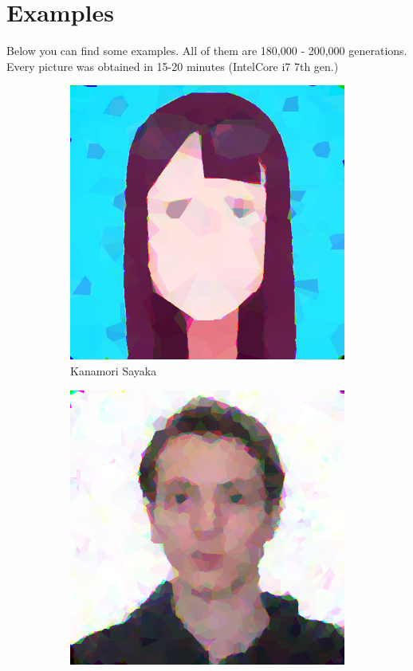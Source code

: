 \documentclass{article}
\begin{document}
\section{Examples}
Below you can find some examples. All of them are 180,000 - 200,000 generations. Every picture was obtained in 15-20 minutes (IntelCore i7 7th gen.)
\begin{figure}[ht]
   	 \centering
     \begin{subfigure}[b]{0.45\textwidth}
         \centering
         \includegraphics[width=\textwidth]{latex_src/voronoi6.png}
         \caption{Kanamori Sayaka}
     \end{subfigure}
     \hfill
     \begin{subfigure}[b]{0.45\textwidth}
         \centering
         \includegraphics[width=\textwidth]{latex_src/voronoi19.png}

\end{subfigure}
\end{figure}
\end{document}
